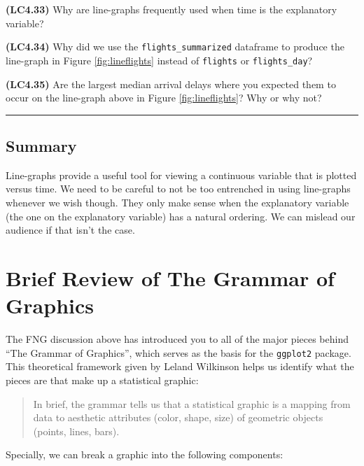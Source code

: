 \documentclass[]{tufte-book}
\begin{document}
\textbf{(LC4.33)} Why are line-graphs frequently used when time is the
explanatory variable?

\textbf{(LC4.34)} Why did we use the \texttt{flights\_summarized}
dataframe to produce the line-graph in Figure \ref{fig:lineflights}
instead of \texttt{flights} or \texttt{flights\_day}?

\textbf{(LC4.35)} Are the largest median arrival delays where you
expected them to occur on the line-graph above in Figure
\ref{fig:lineflights}? Why or why not?

\begin{center}\rule{\linewidth}{\linethickness}\end{center}

\subsection{Summary}\label{summary-4}

Line-graphs provide a useful tool for viewing a continuous variable that
is plotted versus time. We need to be careful to not be too entrenched
in using line-graphs whenever we wish though. They only make sense when
the explanatory variable (the one on the explanatory variable) has a
natural ordering. We can mislead our audience if that isn't the case.

\section{Brief Review of The Grammar of
Graphics}\label{brief-review-of-the-grammar-of-graphics}

The FNG discussion above has introduced you to all of the major pieces
behind ``The Grammar of Graphics'', which serves as the basis for the
\texttt{ggplot2} package. This theoretical framework given by Leland
Wilkinson \citep{wilkinson2005} helps us identify what the pieces are
that make up a statistical graphic:

\begin{quote}
In brief, the grammar tells us that a statistical graphic is a mapping
from data to aesthetic attributes (color, shape, size) of geometric
objects (points, lines, bars).
\end{quote}

Specially, we can break a graphic into the following components:
\end{document}
